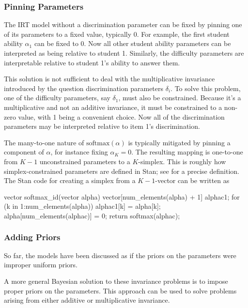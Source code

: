 \subsubsection{Pinning Parameters}

The IRT model without a discrimination parameter can be fixed by
pinning one of its parameters to a fixed value, typically 0.  For
example, the first student ability $\alpha_1$ can be fixed to 0.  Now
all other student ability parameters can be interpreted as being
relative to student 1.  Similarly, the difficulty parameters are
interpretable relative to student 1's ability to answer them.

This solution is not sufficient to deal with the multiplicative
invariance introduced by the question discrimination parameters
$\delta_i$.  To solve this problem, one of the difficulty parameters,
say $\delta_1$, must also be constrained.  Because it's a
multiplicative and not an additive invariance, it must be constrained
to a non-zero value, with 1 being a convenient choice.  Now all of the
discrimination parameters may be interpreted relative to item 1's
discrimination.

The many-to-one nature of $\mbox{softmax}(\alpha)$ is typically
mitigated by pinning a component of $\alpha$, for instance fixing
$\alpha_K = 0$.  The resulting mapping is one-to-one from $K-1$
unconstrained parameters to a $K$-simplex.  This is roughly how
simplex-constrained parameters are defined in Stan; see
 for a precise definition.  The Stan
code for creating a simplex from a $K-1$-vector can be written as
%
\begin{stancode}
vector softmax_id(vector alpha) {
  vector[num_elements(alpha) + 1] alphac1;
  for (k in 1:num_elements(alpha))
    alphac1[k] = alpha[k];
  alpha[num_elements(alphac)] = 0;
  return softmax(alphac);
}
\end{stancode}




\subsubsection{Adding Priors}

So far, the models have been discussed as if the priors on the
parameters were improper uniform priors.  

A more general Bayesian solution to these invariance problems is to
impose proper priors on the parameters.  This approach can be used to
solve problems arising from either additive or multiplicative
invariance.


